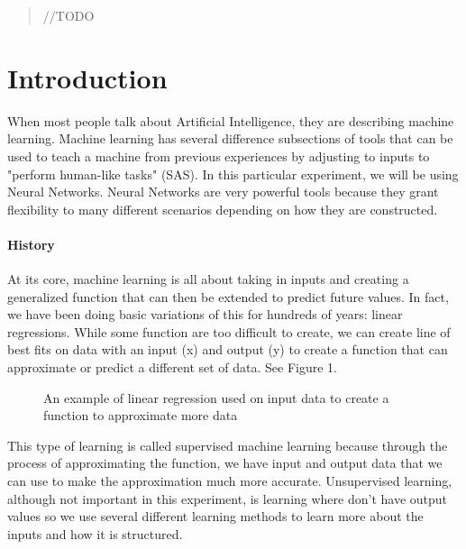 \documentclass[12pt]{article}
\begin{document}
\maketitle

\begin{abstract}
\color{red} //TODO
\end{abstract}

\section{Introduction}
When most people talk about Artificial Intelligence, they are describing machine learning. Machine learning has several difference subsections of tools that can be used to teach a machine from previous experiences by adjusting to inputs to "perform human-like tasks" (SAS). In this particular experiment, we will be using Neural Networks. Neural Networks are very powerful tools because they grant flexibility to many different scenarios depending on how they are constructed. 


\paragraph{History}
At its core, machine learning is all about taking in inputs and creating a generalized function that can then be extended to predict future values. In fact, we have been doing basic variations of this for hundreds of years: linear regressions. While some function are too difficult to create, we can create line of best fits on data with an input (x) and output (y) to create a function that can approximate or predict a different set of data. See Figure 1. 

\begin{figure}[H]
    \centering
    \def\svgwidth{\columnwidth}
    
    \caption{An example of linear regression used on input data to create a function to approximate more data}
\end{figure}

This type of learning is called supervised machine learning because through the process of approximating the function, we have input and output data that we can use to make the approximation much more accurate. Unsupervised learning, although not important in this experiment, is learning where don't have output values so we use several different learning methods to learn more about the inputs and how it is structured. \\%
\end{document}
